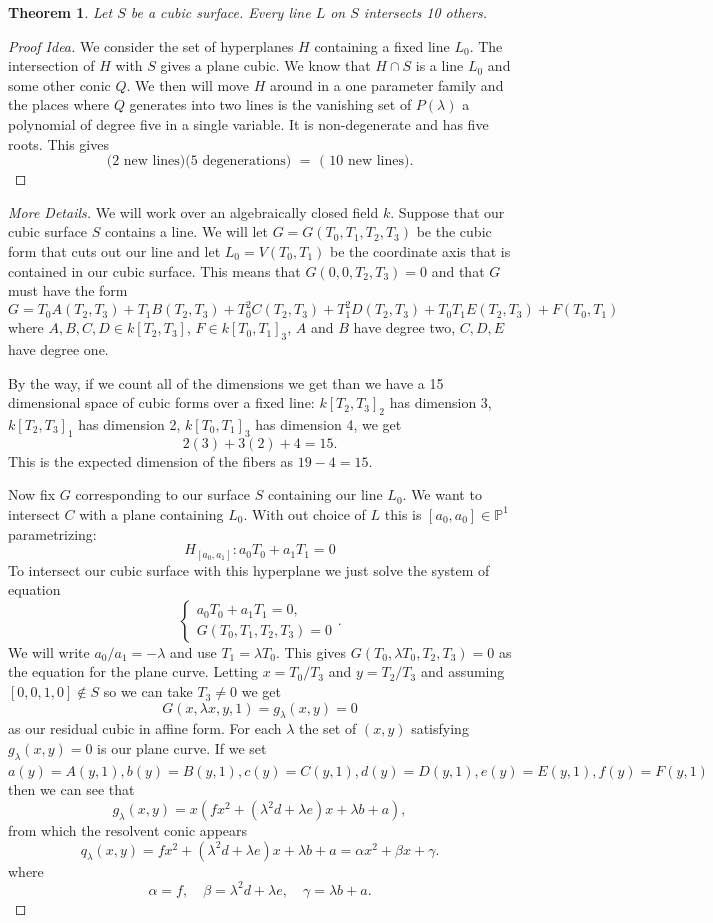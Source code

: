 \documentclass[12pt]{article}
\numberwithin{equation}{section}
\newtheorem{theorem}{Theorem}[subsection]
\theoremstyle{definition}
\theoremstyle{remark}
\newcommand{\PP}{\mathbb{P}}
\begin{document}
\begin{theorem}
	Let $S$ be a cubic surface. 
	Every line $L$ on $S$ intersects 10 others. 
\end{theorem}
\begin{proof}[Proof Idea]
	We consider the set of hyperplanes $H$ containing a fixed line $L_0$. 
	The intersection of $H$ with $S$ gives a plane cubic. 
	We know that $H\cap S$ is a line $L_0$ and some other conic $Q$. 
	We then will move $H$ around in a one parameter family and the places where $Q$ generates into two lines is the vanishing set of $P(\lambda)$ a polynomial of degree five in a single variable. 
	It is non-degenerate and has five roots. 
	This gives 
	 $$  \mbox{ ($2$ new lines)($5$ degenerations) } =\mbox{ ( $10$ new lines). }$$
\end{proof}
\begin{proof}[More Details]
	We will work over an algebraically closed field $k$. 
	Suppose that our cubic surface $S$ contains a line. 
	We will let $G=G(T_0,T_1,T_2,T_3)$ be the cubic form that cuts out our line and let $L_0=V(T_0,T_1)$ be the coordinate axis that is contained in our cubic surface. 
	This means that $G(0,0,T_2,T_3)=0$ and that $G$ must have the form
	 $$ G=T_0A(T_2,T_3)+T_1B(T_2,T_3)+T_0^2C(T_2,T_3)+T_1^2D(T_2,T_3)+T_0T_1E(T_2,T_3) + F(T_0,T_1) $$
	where $A,B,C,D \in k[T_2,T_3]$, $F\in k[T_0,T_1]_3$, $A$ and $B$ have degree two, $C,D,E$ have degree one. 
	
	By the way, if we count all of the dimensions we get than we have a 15 dimensional space of cubic forms over a fixed line: $k[T_2,T_3]_2$ has dimension 3, $k[T_2,T_3]_1$ has dimension 2, $k[T_0,T_1]_3$ has dimension 4, we get  
	 $$ 2(3)+3(2)+4=15.$$
	This is the expected dimension of the fibers as $19-4=15$. 
	
	Now fix $G$ corresponding to our surface $S$ containing our line $L_0$. 
	We want to intersect $C$ with a plane containing $L_0$. 
	With out choice of $L$ this is $[a_0,a_0]\in \PP^1$ parametrizing:
	 $$ H_{[a_0,a_1]}\colon a_0 T_0 + a_1 T_1 =0$$
	To intersect our cubic surface with this hyperplane we just solve the system of equation
$$	\begin{cases}
		a_0T_0+a_1T_1=0,\\
		G(T_0,T_1,T_2,T_3)=0
	\end{cases}.
	$$
	We will write $a_0/a_1=-\lambda$ and use $T_1=\lambda T_0$.
	This gives $G(T_0,\lambda T_0,T_2,T_3)=0$ as the equation for the plane curve. 
	Letting $x=T_0/T_3$ and $y=T_2/T_3$ and assuming $[0,0,1,0]\notin S$ so we can take $T_3\neq 0$ we get 
	 $$ G(x,\lambda x ,y,1) = g_{\lambda}(x,y)=0$$
	as our residual cubic in affine form.
	For each $\lambda$ the set of $(x,y)$ satisfying $g_{\lambda}(x,y)=0$ is our plane curve. 
	If we set $a(y) = A(y,1), b(y)=B(y,1), c(y)=C(y,1), d(y)=D(y,1), e(y)=E(y,1), f(y) = F(y,1)$ then we can see that
	 $$ g_{\lambda}(x,y) = x( f x^2 + (\lambda^2 d+\lambda e )x + \lambda b+a), $$
	from which the resolvent conic appears
	 $$ q_{\lambda}(x,y) = f x^2 + (\lambda^2 d+\lambda e )x + \lambda b+a = \alpha x^2 + \beta x + \gamma.$$
	where 
	 $$ \alpha = f, \quad \beta =\lambda^2 d+\lambda e, \quad \gamma = \lambda b+a. $$
	

\end{proof}
\end{document}
